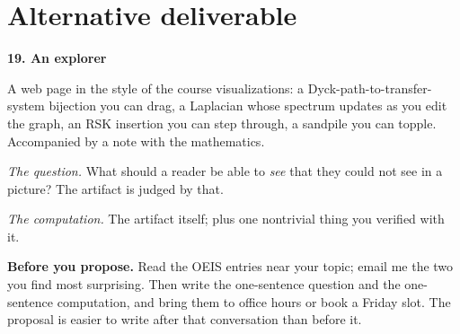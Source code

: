 \documentclass[11pt]{amsart}
\newcommand{\project}[5]{%
  \medskip\noindent\textbf{#1}\quad{\small\textit{#2}}\par\smallskip
  \noindent #3\par\smallskip
  \noindent\textit{The question.} #4\par\smallskip
  \noindent\textit{The computation.} #5\par}
\begin{document}
\section*{Alternative deliverable}

\project{19. An explorer}
{any act}
{A web page in the style of the course visualizations: a Dyck-path-to-transfer-system
bijection you can drag, a Laplacian whose spectrum updates as you edit the graph, an RSK
insertion you can step through, a sandpile you can topple. Accompanied by a note with the
mathematics.}
{What should a reader be able to \emph{see} that they could not see in a picture? The
artifact is judged by that.}
{The artifact itself; plus one nontrivial thing you verified with it.}

\bigskip
\noindent\textbf{Before you propose.} Read the OEIS entries near your topic; email me the
two you find most surprising. Then write the one-sentence question and the one-sentence
computation, and bring them to office hours or book a Friday slot. The proposal is easier to
write after that conversation than before it.
\end{document}
